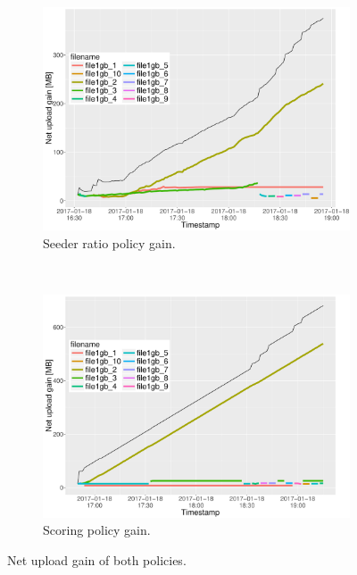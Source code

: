 \begin{figure}[b!]
	\begin{adjustwidth}{-1.5cm}{}
		\begin{subfigure}[t]{0.6\textwidth}
			\centering
			\includegraphics[width=\textwidth]{pics/results/simple1_sr_notrig.pdf}
			\caption{Seeder ratio policy gain.}
			\label{fig:simplesrnotrig}
		\end{subfigure}
		~
		\begin{subfigure}[t]{0.6\textwidth}
			\centering
			\includegraphics[width=\textwidth]{pics/results/simple1_scsr_notrig.pdf}
			\caption{Scoring policy gain.}
			\label{fig:simplescsrnotrig}
		\end{subfigure}
		\caption{Net upload gain of both policies.}
	\end{adjustwidth}
\end{figure} 

